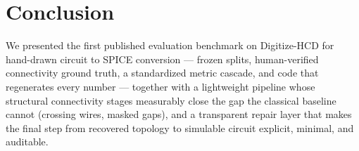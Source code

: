 \section{Conclusion}
\label{sec:conclusion}


We presented the first published evaluation benchmark on Digitize-HCD
for hand-drawn circuit to SPICE conversion — frozen splits,
human-verified connectivity ground truth, a standardized metric
cascade, and code that regenerates every number — together with a
lightweight pipeline whose structural connectivity stages measurably
close the gap the classical baseline cannot (crossing wires, masked
gaps), and a transparent repair layer that makes the final step from
recovered topology to simulable circuit explicit, minimal, and
auditable. 
